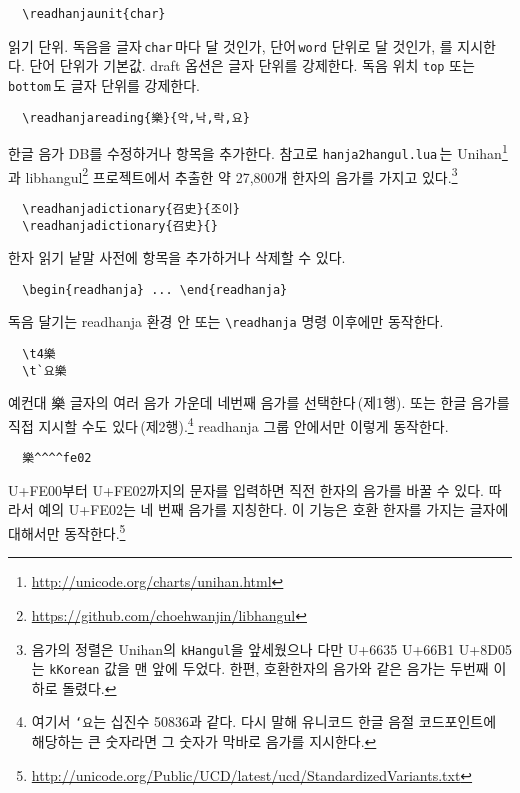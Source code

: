 \documentclass[b5paper]{article}
\begin{document}
\begin{verbatim}
  \readhanjaunit{char}
\end{verbatim}
읽기 단위. 독음을 글자\,\verb|char|\,마다 달 것인가, 단어\,\verb|word| 단위로
달 것인가, 를 지시한다. 단어 단위가 기본값.
draft 옵션은 글자 단위를 강제한다.
독음 위치 \verb|top| 또는 \verb|bottom|\,도 글자 단위를 강제한다.

\begin{verbatim}
  \readhanjareading{樂}{악,낙,락,요}
\end{verbatim}
한글 음가 DB를 수정하거나 항목을 추가한다. 참고로 \verb|hanja2hangul.lua|\,는
Unihan\footnote{\url{http://unicode.org/charts/unihan.html}}과
libhangul\footnote{\url{https://github.com/choehwanjin/libhangul}}
프로젝트에서 추출한 약 27,800개 한자의 음가를
가지고 있다.\footnote{음가의 정렬은 Unihan의 \texttt{kHangul}을 앞세웠으나
  다만 \mbox{U+6635} \mbox{U+66B1} \mbox{U+8D05}는 \texttt{kKorean} 값을
  맨 앞에 두었다. 한편, 호환한자의 음가와 같은 음가는 두번째 이하로 돌렸다.}

\begin{verbatim}
  \readhanjadictionary{召史}{조이}
  \readhanjadictionary{召史}{}
\end{verbatim}
한자 읽기 낱말 사전에 항목을 추가하거나 삭제할 수 있다.

\begin{verbatim}
  \begin{readhanja} ... \end{readhanja}
\end{verbatim}
독음 달기는 readhanja 환경 안 또는 \verb|\readhanja| 명령 이후에만 동작한다.

\begin{verbatim}
  \t4樂
  \t`요樂
\end{verbatim}
예컨대 樂 글자의 여러 음가 가운데 네번째 음가를 선택한다\,(제1행).
또는 한글 음가를 직접 지시할 수도 있다\,(제2행).\footnote{여기서 \texttt{`요}는 십진수 50836과 같다.
  다시 말해 유니코드 한글 음절 코드포인트에 해당하는 큰 숫자라면 그 숫자가 막바로 음가를 지시한다.}
readhanja 그룹 안에서만 이렇게 동작한다.

\begin{verbatim}
  樂^^^^fe02
\end{verbatim}
\mbox{U+FE00}부터 \mbox{U+FE02}까지의 문자를 입력하면 직전 한자의 음가를
바꿀 수 있다. 따라서 예의 \mbox{U+FE02}는 네 번째 음가를 지칭한다.
이 기능은 호환 한자를 가지는 글자에 대해서만 동작한다.\footnote{
\url{http://unicode.org/Public/UCD/latest/ucd/StandardizedVariants.txt}}
\end{document}
